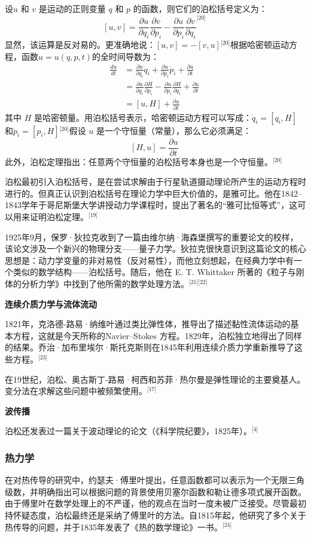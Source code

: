 设$u$ 和 $v$ 是运动的正则变量 $q$ 和 $p$ 的函数，则它们的泊松括号定义为：
$$
[u, v] = \frac{\partial u}{\partial q_i} \frac{\partial v}{\partial p_i} - \frac{\partial u}{\partial p_i} \frac{\partial v}{\partial q_i}^\text{[20]}~
$$
显然，该运算是反对易的。更准确地说：$[u, v] = -[v, u]$\(^\text{[20]}\)根据哈密顿运动方程，函数$u = u(q, p, t)$的全时间导数为：
$$
\begin{aligned}
\frac{du}{dt} &= \frac{\partial u}{\partial q_i} \dot{q}_i + \frac{\partial u}{\partial p_i} \dot{p}_i + \frac{\partial u}{\partial t} \\
&= \frac{\partial u}{\partial q_i} \frac{\partial H}{\partial p_i} - \frac{\partial u}{\partial p_i} \frac{\partial H}{\partial q_i} + \frac{\partial u}{\partial t} \\
&= [u, H] + \frac{\partial u}{\partial t}
\end{aligned}~
$$
其中 $H$ 是哈密顿量。用泊松括号表示，哈密顿运动方程可以写成：$\dot{q}_i = [q_i, H]$ 和$\dot{p}_i = [p_i, H]$\(^\text{[20]}\)假设 $u$ 是一个守恒量（常量），那么它必须满足：
$$
[H, u] = \frac{\partial u}{\partial t}~
$$
此外，泊松定理指出：任意两个守恒量的泊松括号本身也是一个守恒量。\(^\text{[20]}\)

泊松最初引入泊松括号，是在尝试求解由于行星轨道摄动理论所产生的运动方程时进行的。但真正认识到泊松括号在理论力学中巨大价值的，是雅可比。他在1842–1843学年于哥尼斯堡大学讲授动力学课程时，提出了著名的“雅可比恒等式”，这可以用来证明泊松定理。\(^\text{[19]}\)

1925年9月，保罗·狄拉克收到了一篇由维尔纳·海森堡撰写的重要论文的校样，该论文涉及一个新兴的物理分支——量子力学。狄拉克很快意识到这篇论文的核心思想是：动力学变量的非对易性（反对易性），而他立刻想起，在经典力学中有一个类似的数学结构——泊松括号。随后，他在 E. T. Whittaker 所著的《粒子与刚体的分析力学》中找到了他所需的数学处理方法。\(^\text{[21][22]}\)

\textbf{连续介质力学与流体流动}

1821年，克洛德-路易·纳维叶通过类比弹性体，推导出了描述黏性流体运动的基本方程，这就是今天所称的Navier–Stokes 方程。1829年，泊松独立地得出了同样的结果。乔治·加布里埃尔·斯托克斯则在1845年利用连续介质力学重新推导了这些方程。\(^\text{[23]}\)

在19世纪，泊松、奥古斯丁-路易·柯西和苏菲·热尔曼是弹性理论的主要奠基人。变分法在求解这些问题中被频繁使用。\(^\text{[17]}\)

\textbf{波传播}

泊松还发表过一篇关于波动理论的论文（《科学院纪要》，1825年）。\(^\text{[4]}\)
\subsubsection{热力学}
在对热传导的研究中，约瑟夫·傅里叶提出，任意函数都可以表示为一个无限三角级数，并明确指出可以根据问题的背景使用贝塞尔函数和勒让德多项式展开函数。由于傅里叶在数学处理上的不严谨，他的观点在当时一度未被广泛接受。尽管最初持怀疑态度，泊松最终还是采纳了傅里叶的方法。自1815年起，他研究了多个关于热传导的问题，并于1835年发表了《热的数学理论》一书。\(^\text{[24]}\)

